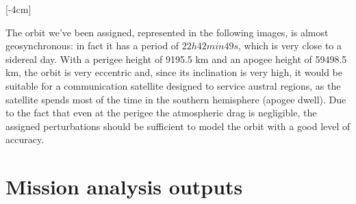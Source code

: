 \documentclass[11pt,a4paper]{report}
\begin{document}
\begin{table}[H]
\centering
{}
\caption{Mission requirements}
\label{tab:Mission_requirements}
\end{table}

[-4cm]

The orbit we've been assigned, represented in the following images, is almost geosynchronous: in fact it has a period of $22h 42 min 49s$, which is very close to a sidereal day. With a perigee height of 9195.5 km and an apogee height of 59498.5 km, the orbit is very eccentric and, since its inclination is very high, it would be suitable for a communication satellite designed to service austral regions, as the satellite spends most of the time in the southern hemisphere (apogee dwell).  
Due to the fact that even at the perigee the atmospheric drag is negligible, the assigned perturbations should be sufficient to model the orbit with a good level of accuracy.
\section{Mission analysis outputs}
\end{document}
